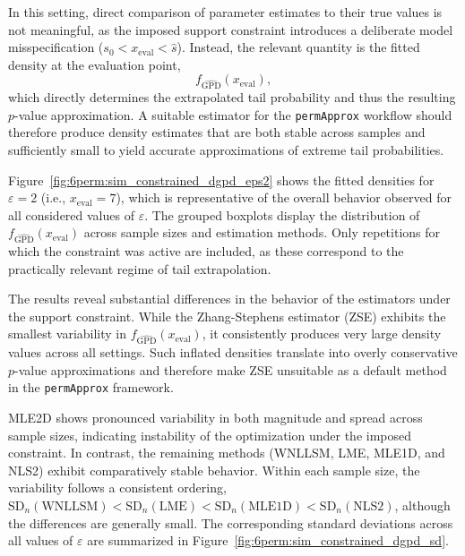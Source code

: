 In this setting, direct comparison of parameter estimates to their true values is not meaningful, as the imposed support constraint introduces a deliberate model misspecification ($s_0 < x_{\mathrm{eval}} < \hat{s}$). Instead, the relevant quantity is the fitted density at the evaluation point,
\begin{equation}
f_{\widehat{\mathrm{GPD}}}(x_{\mathrm{eval}}),
\end{equation}
which directly determines the extrapolated tail probability and thus the resulting $p$-value approximation. A suitable estimator for the \texttt{permApprox} workflow should therefore produce density estimates that are both stable across samples and sufficiently small to yield accurate approximations of extreme tail probabilities.

Figure~\ref{fig:6perm:sim_constrained_dgpd_eps2} shows the fitted densities for $\varepsilon = 2$ (i.e., $x_{\mathrm{eval}} = 7$), which is representative of the overall behavior observed for all considered values of $\varepsilon$. The grouped boxplots display the distribution of $f_{\widehat{\mathrm{GPD}}}(x_{\mathrm{eval}})$ across sample sizes and estimation methods. Only repetitions for which the constraint was active are included, as these correspond to the practically relevant regime of tail extrapolation.

The results reveal substantial differences in the behavior of the estimators under the support constraint. 
While the Zhang-Stephens estimator (ZSE) exhibits the smallest variability in $f_{\widehat{\mathrm{GPD}}}(x_{\mathrm{eval}})$, it consistently produces very large density values across all settings. 
Such inflated densities translate into overly conservative $p$-value approximations and therefore make ZSE unsuitable as a default method in the \texttt{permApprox} framework.

MLE2D shows pronounced variability in both magnitude and spread across sample sizes, indicating instability of the optimization under the imposed constraint. 
In contrast, the remaining methods (WNLLSM, LME, MLE1D, and NLS2) exhibit comparatively stable behavior. 
Within each sample size, the variability follows a consistent ordering,
$\mathrm{SD}_n(\text{WNLLSM}) < \mathrm{SD}_n(\text{LME}) < \mathrm{SD}_n(\text{MLE1D}) < \mathrm{SD}_n(\text{NLS2})$,
although the differences are generally small. The corresponding standard deviations across all values of $\varepsilon$ are summarized in Figure~\ref{fig:6perm:sim_constrained_dgpd_sd}.

